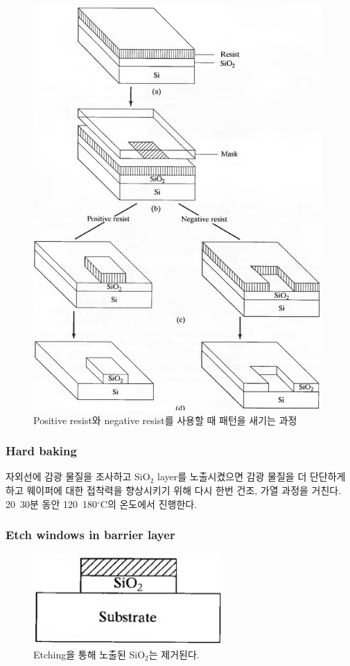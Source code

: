 \documentclass[aps,reprint,superscriptaddress,10pt]{revtex4-2}
\begin{document}
\begin{figure}[htbp]
  \centering
\includegraphics[scale=0.5]{pattern.png}

  \caption{Positive resist와 negative resist를 사용할 때 패턴을 새기는 과정}
  \label{fig:pattern}
\end{figure}

\subsubsection{Hard baking}
자외선에 감광 물질을 조사하고 SiO$_2$ layer를 노출시켰으면 감광 물질을 더 단단하게 하고
웨이퍼에 대한 접착력을 향상시키기 위해 다시 한번 건조, 가열 과정을 거친다.
20~30분 동안 120~180$^\circ$C의 온도에서 진행한다.

\subsubsection{Etch windows in barrier layer}

\begin{figure}[htbp]
  \centering
  \includegraphics[scale=0.4]{e.png}
  \caption{Etching을 통해 노출된 SiO$_2$는 제거된다.}
    \label{fig:e}
  \end{figure}
\end{document}
